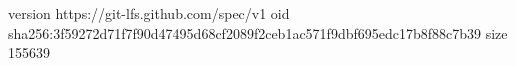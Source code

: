 version https://git-lfs.github.com/spec/v1
oid sha256:3f59272d71f7f90d47495d68cf2089f2ceb1ac571f9dbf695edc17b8f88c7b39
size 155639

